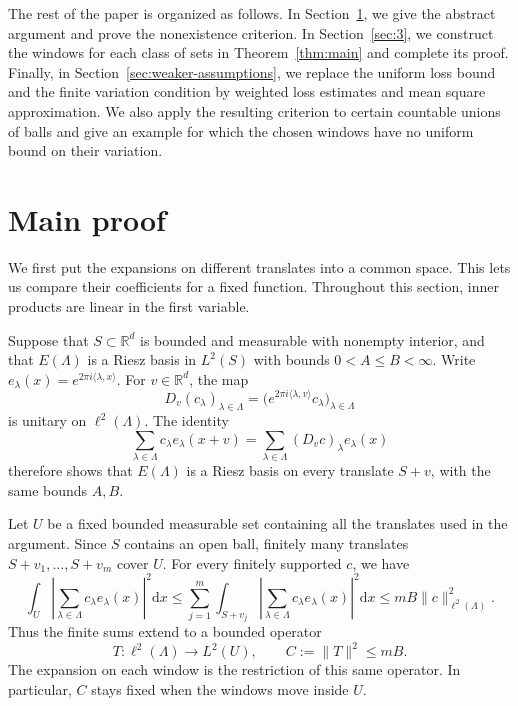 \documentclass[12pt,reqno,tbtags]{amsart}
\def\R{\mathbb{R}}
\def\d{\mathrm{d}}
\newcommand\norm[1]{\|#1\|}
\newcommand\inpro[2]{\langle #1,#2\rangle}
\newcommand\1{\mathbbm{1}}
\def\d{\mathrm{d}}
\begin{document}
The rest of the paper is organized as follows.
In Section~\ref{sec:main-proof}, we give the abstract argument and prove the
nonexistence criterion.
In Section~\ref{sec:3}, we construct the windows for each class of sets in
Theorem~\ref{thm:main} and complete its proof.
Finally, in Section~\ref{sec:weaker-assumptions}, we replace the uniform
loss bound and the finite variation condition by weighted loss estimates and
mean square approximation. We also apply the resulting criterion to certain
countable unions of balls and give an example for which the chosen windows
have no uniform bound on their variation.

\section{Main proof}\label{sec:main-proof}

We first put the expansions on different translates into a common space.
This lets us compare their coefficients for a fixed function. Throughout this section, inner products are linear in the
first variable.

Suppose that $S\subset\R^d$ is bounded and measurable with nonempty interior, and that
$E(\Lambda)$ is a Riesz basis in $L^2(S)$ with bounds $0<A\le B<\infty$.
Write $e_\lambda(x)=e^{2\pi i\inpro{\lambda}{x}}$.
For $v\in\R^d$, the map
\begin{equation*}
    D_v(c_\lambda)_{\lambda\in\Lambda}
    =\bigl(e^{2\pi i\inpro{\lambda}{v}}c_\lambda\bigr)_{\lambda\in\Lambda}
\end{equation*}
is unitary on $\ell^2(\Lambda)$. The identity
\begin{equation*}
    \sum_{\lambda\in\Lambda}c_\lambda e_\lambda(x+v)
    =\sum_{\lambda\in\Lambda}(D_vc)_\lambda e_\lambda(x)
\end{equation*}
therefore shows that $E(\Lambda)$ is a Riesz basis on every translate $S+v$,
with the same bounds $A,B$.

Let $U$ be a fixed bounded measurable set containing all the translates used
in the argument. Since $S$ contains an open ball, finitely many translates
$S+v_1,\ldots,S+v_m$ cover $U$. For every finitely supported $c$, we have
\begin{equation*}
    \int_U\left|\sum_{\lambda\in\Lambda}c_\lambda e_\lambda(x)\right|^2\d x
    \le\sum_{j=1}^{m}\int_{S+v_j}
       \left|\sum_{\lambda\in\Lambda}c_\lambda e_\lambda(x)\right|^2\d x
    \le mB\norm{c}_{\ell^2(\Lambda)}^2.
\end{equation*}
Thus the finite sums extend to a bounded operator
\begin{equation}\label{eq:main-synthesis}
    T:\ell^2(\Lambda)\longrightarrow L^2(U),
    \qquad C:=\norm{T}^2\le mB.
\end{equation}
The expansion on each window is the restriction of this same operator.
In particular, $C$ stays fixed when the windows move inside $U$.
\end{document}
